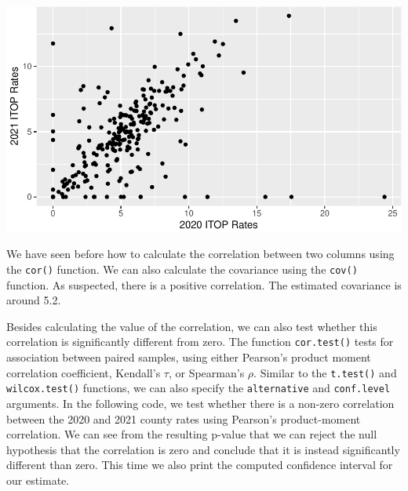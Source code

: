 \documentclass[
  letterpaper,
]{latex/krantz}
\makeatletter
\newenvironment{Shaded}{\begin{snugshade}}{\end{snugshade}}
\newcommand{\CommentTok}[1]{\textcolor[rgb]{0.37,0.37,0.37}{#1}}
\newcommand{\FunctionTok}[1]{\textcolor[rgb]{0.28,0.35,0.67}{#1}}
\newcommand{\NormalTok}[1]{\textcolor[rgb]{0.00,0.23,0.31}{#1}}
\newcommand{\SpecialCharTok}[1]{\textcolor[rgb]{0.37,0.37,0.37}{#1}}
\newenvironment{kframe}{%
\medskip{}
\setlength{\fboxsep}{.8em}
 \def\at@end@of@kframe{}%
 \ifinner\ifhmode%
  \def\at@end@of@kframe{\end{minipage}}%
  \begin{minipage}{\columnwidth}%
 \fi\fi%
 \def\FrameCommand##1{\hskip\@totalleftmargin \hskip-\fboxsep
 \colorbox{shadecolor}{##1}\hskip-\fboxsep
     \hskip-\linewidth \hskip-\@totalleftmargin \hskip\columnwidth}%
 \MakeFramed {\advance\hsize-\width
   \@totalleftmargin\z@ \linewidth\hsize
   \@setminipage}}%
 {\par\unskip\endMakeFramed%
 \at@end@of@kframe}
\renewenvironment{Shaded}{\begin{kframe}}{\end{kframe}}
\makeatother
\begin{document}
\begin{center}
\includegraphics[width=1\textwidth,height=\textheight]{book/hypothesis_tests_files/figure-pdf/unnamed-chunk-13-1.pdf}
\end{center}

We have seen before how to calculate the correlation between two columns
using the \texttt{cor()}
function. We can also calculate the covariance using the
\texttt{cov()} function. As
suspected, there is a positive correlation. The estimated covariance is
around 5.2.

\begin{Shaded}
\end{Shaded}

Besides calculating the value of the correlation, we can also test
whether this correlation is significantly different from zero. The
function
\texttt{cor.test()}
tests for association between paired samples, using either Pearson's
product moment correlation coefficient, Kendall's \(\tau\), or
Spearman's \(\rho.\) Similar to the \texttt{t.test()} and
\texttt{wilcox.test()} functions, we can also specify the
\texttt{alternative} and \texttt{conf.level} arguments. In the following
code, we test whether there is a non-zero correlation between the 2020
and 2021 county rates using Pearson's product-moment correlation. We can
see from the resulting p-value that we can reject the null hypothesis
that the correlation is zero and conclude that it is instead
significantly different than zero. This time we also print the computed
confidence interval for our estimate.
\end{document}
